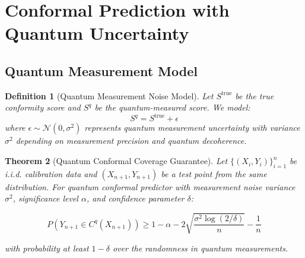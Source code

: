 \documentclass[11pt]{article}
\newtheorem{theorem}{Theorem}[section]
\newtheorem{definition}[theorem]{Definition}
\begin{document}
\section{Conformal Prediction with Quantum Uncertainty}

\subsection{Quantum Measurement Model}

\begin{definition}[Quantum Measurement Noise Model]
Let $S^{\text{true}}$ be the true conformity score and $S^q$ be the quantum-measured score. We model:
$$S^q = S^{\text{true}} + \epsilon$$
where $\epsilon \sim \mathcal{N}(0, \sigma^2)$ represents quantum measurement uncertainty with variance $\sigma^2$ depending on measurement precision and quantum decoherence.
\end{definition}

\begin{theorem}[Quantum Conformal Coverage Guarantee]
\label{thm:quantum_conformal_detailed}
Let $\{(X_i, Y_i)\}_{i=1}^n$ be i.i.d. calibration data and $(X_{n+1}, Y_{n+1})$ be a test point from the same distribution. For quantum conformal predictor with measurement noise variance $\sigma^2$, significance level $\alpha$, and confidence parameter $\delta$:

$$P\left(Y_{n+1} \in C^q(X_{n+1})\right) \geq 1 - \alpha - 2\sqrt{\frac{\sigma^2\log(2/\delta)}{n}} - \frac{1}{n}$$

with probability at least $1-\delta$ over the randomness in quantum measurements.
\end{theorem}
\end{document}
